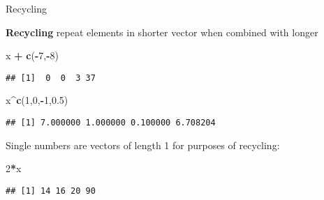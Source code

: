 \documentclass[8pt,ignorenonframetext,]{beamer}
\newenvironment{Shaded}{\begin{snugshade}}{\end{snugshade}}
\newcommand{\KeywordTok}[1]{\textcolor[rgb]{0.13,0.29,0.53}{\textbf{#1}}}
\newcommand{\DecValTok}[1]{\textcolor[rgb]{0.00,0.00,0.81}{#1}}
\newcommand{\FloatTok}[1]{\textcolor[rgb]{0.00,0.00,0.81}{#1}}
\newcommand{\StringTok}[1]{\textcolor[rgb]{0.31,0.60,0.02}{#1}}
\newcommand{\OperatorTok}[1]{\textcolor[rgb]{0.81,0.36,0.00}{\textbf{#1}}}
\newcommand{\NormalTok}[1]{#1}
\begin{document}
\begin{frame}[fragile]{Recycling}

\textbf{Recycling} repeat elements in shorter vector when combined with
longer

\begin{Shaded}
\begin{Highlighting}[]
\NormalTok{x }\OperatorTok{+}\StringTok{ }\KeywordTok{c}\NormalTok{(}\OperatorTok{-}\DecValTok{7}\NormalTok{,}\OperatorTok{-}\DecValTok{8}\NormalTok{)}
\end{Highlighting}
\end{Shaded}

\begin{verbatim}
## [1]  0  0  3 37
\end{verbatim}

\begin{Shaded}
\begin{Highlighting}[]
\NormalTok{x}\OperatorTok{^}\KeywordTok{c}\NormalTok{(}\DecValTok{1}\NormalTok{,}\DecValTok{0}\NormalTok{,}\OperatorTok{-}\DecValTok{1}\NormalTok{,}\FloatTok{0.5}\NormalTok{)}
\end{Highlighting}
\end{Shaded}

\begin{verbatim}
## [1] 7.000000 1.000000 0.100000 6.708204
\end{verbatim}

Single numbers are vectors of length 1 for purposes of recycling:

\begin{Shaded}
\begin{Highlighting}[]
\DecValTok{2}\OperatorTok{*}\NormalTok{x}
\end{Highlighting}
\end{Shaded}

\begin{verbatim}
## [1] 14 16 20 90
\end{verbatim}

\end{frame}
\end{document}
